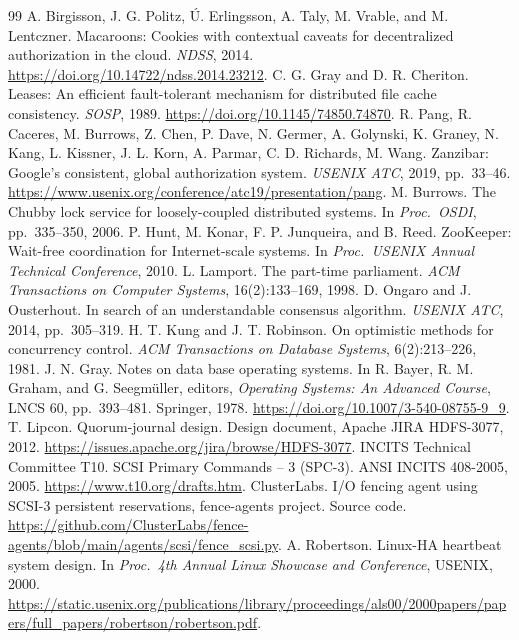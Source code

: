 \begin{thebibliography}{99}
 A. Birgisson, J. G. Politz, \'U. Erlingsson, A. Taly, M. Vrable, and M. Lentczner. Macaroons: Cookies with contextual caveats for decentralized authorization in the cloud. \emph{NDSS}, 2014. \url{https://doi.org/10.14722/ndss.2014.23212}.
 C. G. Gray and D. R. Cheriton. Leases: An efficient fault-tolerant mechanism for distributed file cache consistency. \emph{SOSP}, 1989. \url{https://doi.org/10.1145/74850.74870}.
 R. Pang, R. Caceres, M. Burrows, Z. Chen, P. Dave, N. Germer, A. Golynski, K. Graney, N. Kang, L. Kissner, J. L. Korn, A. Parmar, C. D. Richards, M. Wang. Zanzibar: Google's consistent, global authorization system. \emph{USENIX ATC}, 2019, pp.~33--46. \url{https://www.usenix.org/conference/atc19/presentation/pang}.
 M. Burrows. The Chubby lock service for loosely-coupled distributed systems. In \emph{Proc.\ OSDI}, pp.~335--350, 2006.
 P. Hunt, M. Konar, F. P. Junqueira, and B. Reed. ZooKeeper: Wait-free coordination for Internet-scale systems. In \emph{Proc.\ USENIX Annual Technical Conference}, 2010.
 L. Lamport. The part-time parliament. \emph{ACM Transactions on Computer Systems}, 16(2):133--169, 1998.
 D. Ongaro and J. Ousterhout. In search of an understandable consensus algorithm. \emph{USENIX ATC}, 2014, pp.~305--319.
 H. T. Kung and J. T. Robinson. On optimistic methods for concurrency control. \emph{ACM Transactions on Database Systems}, 6(2):213--226, 1981.
 J. N. Gray. Notes on data base operating systems. In R. Bayer, R. M. Graham, and G. Seegm\"uller, editors, \emph{Operating Systems: An Advanced Course}, LNCS 60, pp.~393--481. Springer, 1978. \url{https://doi.org/10.1007/3-540-08755-9_9}.
 T. Lipcon. Quorum-journal design. Design document, Apache JIRA HDFS-3077, 2012. \url{https://issues.apache.org/jira/browse/HDFS-3077}.
 INCITS Technical Committee T10. SCSI Primary Commands -- 3 (SPC-3). ANSI INCITS 408-2005, 2005. \url{https://www.t10.org/drafts.htm}.
 ClusterLabs. I/O fencing agent using SCSI-3 persistent reservations, fence-agents project. Source code. \url{https://github.com/ClusterLabs/fence-agents/blob/main/agents/scsi/fence_scsi.py}.
 A. Robertson. Linux-HA heartbeat system design. In \emph{Proc.\ 4th Annual Linux Showcase and Conference}, USENIX, 2000. \url{https://static.usenix.org/publications/library/proceedings/als00/2000papers/papers/full_papers/robertson/robertson.pdf}.

\end{thebibliography}
